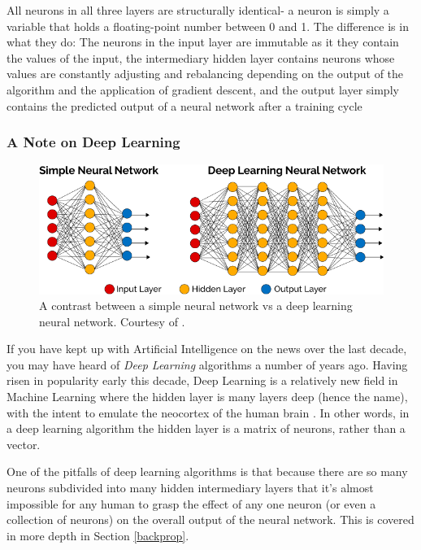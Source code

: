 \documentclass[12pt]{article}
\begin{document}
All neurons in all three layers are structurally identical- a neuron is simply a variable that holds a floating-point number between 0 and 1. The difference is in what they do: The neurons in the input layer are immutable as it they contain the values of the input, the intermediary hidden layer contains neurons whose values are constantly adjusting and rebalancing depending on the output of the algorithm and the application of gradient descent, and the output layer simply contains the predicted output of a neural network after a training cycle

\subsubsection{A Note on Deep Learning}

\begin{figure}[h]
  \centering
  \includegraphics[width=\textwidth]{DeepLearning-diagram.png}
  \caption{A contrast between a simple neural network vs a deep learning neural network. Courtesy of \textcite{vazquez17}. \label{deeplearningfig}}
\end{figure}

If you have kept up with Artificial Intelligence on the news over the last decade, you may have heard of \textit{Deep Learning} algorithms a number of years ago. Having risen in popularity early this decade, Deep Learning is a relatively new field in Machine Learning where the hidden layer is many layers deep (hence the name), with the intent to emulate the neocortex of the human brain \textcite{Hof2013}. In other words, in a deep learning algorithm the hidden layer is a matrix of neurons, rather than a vector.

One of the pitfalls of deep learning algorithms is that because there are so many neurons subdivided into many hidden intermediary layers that it's almost impossible for any human to grasp the effect of any one neuron (or even a collection of neurons) on the overall output of the neural network. This is covered in more depth in Section \ref{backprop}.
\end{document}
